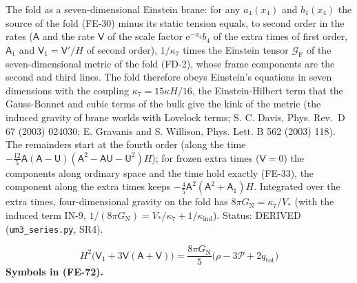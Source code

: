 \documentclass[
  10pt,
]{article}
\begin{document}
The fold as a seven-dimensional Einstein brane: for any \(a_4(x_4)\) and
\(b_4(x_4)\) the source of the fold (FE-30) minus its static tension
equals, to second order in the rates (\(\mathsf{A}\) and the rate
\(\mathsf{V}\) of the scale factor \(\mathrm{e}^{-a_4}b_4\) of the extra
times of first order, \(\mathsf{A}_1\) and
\(\mathsf{V}_1 = \mathsf{V}'/H\) of second order), \(1/\kappa_7\) times
the Einstein tensor \(\mathcal{G}_{\mathrm{F}}\) of the
seven-dimensional metric of the fold (FD-2), whose frame components are
the second and third lines. The fold therefore obeys Einstein's
equations in seven dimensions with the coupling
\(\kappa_7 = 15\kappa H/16\), the Einstein-Hilbert term that the
Gauss-Bonnet and cubic terms of the bulk give the kink of the metric
(the induced gravity of brane worlds with Lovelock terms; S. C. Davis,
Phys. Rev.~D 67 (2003) 024030; E. Gravanis and S. Willison, Phys. Lett.
B 562 (2003) 118). The remainders start at the fourth order (along the
time
\(-\frac{12}{5}\mathsf{A}(\mathsf{A} - \mathsf{U})(\mathsf{A}^2 - \mathsf{A}\mathsf{U} - \mathsf{U}^2)H\));
for frozen extra times (\(\mathsf{V} = 0\)) the components along
ordinary space and the time hold exactly (FE-33), the component along
the extra times keeps
\(-\frac45\mathsf{A}^2(\mathsf{A}^2 + \mathsf{A}_1)H\). Integrated over
the extra times, four-dimensional gravity on the fold has
\(8\pi G_{\mathrm{N}} = \kappa_7/V_*\) (with the induced term IN-9,
\(1/(8\pi G_{\mathrm{N}}) = V_*/\kappa_7 + 1/\kappa_{\mathrm{ind}}\)).
Status: DERIVED (\texttt{um3\_series.py}, SR4).

\[
H^2\big(\mathsf{V}_1 + 3\mathsf{V}(\mathsf{A} + \mathsf{V})\big) = \frac{8\pi G_{\mathrm{N}}}{5}\big(\rho - 3\mathcal{P} + 2q_{\mathrm{tot}}\big) \tag{FE-72}
\] \textbf{Symbols in (FE-72).}
\end{document}
